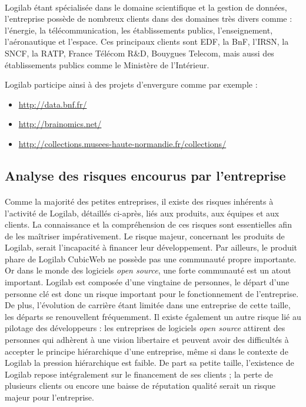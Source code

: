 \documentclass {report}
\begin{document}
\paragraph{}
Logilab étant spécialisée dans le domaine scientifique et la gestion de données, l'entreprise possède de nombreux clients dans des domaines très divers comme : l'énergie, la télécommunication, les établissements publics, l'enseignement, l'aéronautique et l'espace. Ces principaux clients sont EDF, la BnF\footnotemark[1], l'IRSN\footnotemark[2], la SNCF, la  RATP, France Télécom R\&D, Bouygues Telecom, mais aussi des établissements publics comme le Ministère de l'Intérieur.



    Logilab participe ainsi à des projets d'envergure comme par exemple :
\begin{itemize}
\item \url{http://data.bnf.fr/}
\item \url{http://brainomics.net/}
\item \url{http://collections.musees-haute-normandie.fr/collections/}
\end{itemize}

\subsection{Analyse des risques encourus par l'entreprise}
\paragraph{}
Comme la majorité des petites entreprises, il existe des risques inhérents à l'activité de Logilab, détaillés ci-après, liés aux produits, aux équipes et aux clients. La connaissance et la compréhension de ces risques sont essentielles afin de les maîtriser impérativement. Le risque majeur, concernant les produits de Logilab, serait l'incapacité à financer leur développement. Par ailleurs, le produit phare de Logilab CubicWeb ne possède pas une communauté propre importante. Or dans le monde des logiciels \textit{open source}, une forte communauté est un atout important. Logilab est composée d'une vingtaine de personnes, le départ d'une personne clé est donc un risque important pour le fonctionnement de l'entreprise. De plus, l'évolution de carrière étant limitée dans une entreprise de cette taille, les départs se renouvellent fréquemment. Il existe également un autre risque lié au pilotage des développeurs : les entreprises de logiciels \textit{open source} attirent des personnes qui adhèrent à une vision libertaire et peuvent avoir des difficultés à accepter le principe hiérarchique d'une entreprise, même si dans le contexte de Logilab la pression hiérarchique est faible. De part sa petite taille, l'existence de Logilab repose intégralement sur le financement de ses clients ; la perte de plusieurs clients ou encore une baisse de réputation qualité serait un risque majeur pour l'entreprise.
\end{document}
